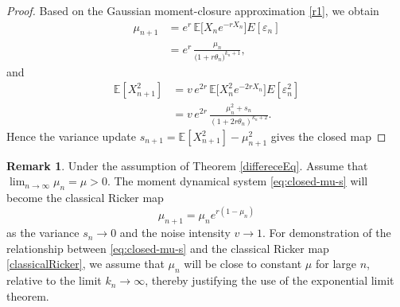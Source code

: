 \documentclass[12pt]{article}
\theoremstyle{definition}
\newtheorem{remark}[theorem]{Remark}
\begin{document}
\begin{proof}
Based on the Gaussian moment-closure approximation \eqref{r1}, we obtain
\begin{align}
\mu_{n+1}
&= e^{r}\,\mathbb{E}\big[X_n e^{-r X_n}\big] E[\varepsilon_n]\\
&= e^{r}\,\frac{\mu_n}{\big(1 + r \theta_n\big)^{k_n+1}},
\label{eq:ricker-mu}
\end{align}
and
\begin{align}
\mathbb{E}[X_{n+1}^2]
&= v\,e^{2r}\,\mathbb{E}\big[X_n^2 e^{-2rX_n}\big] E[\varepsilon_n^2] \\
&= v\,e^{2r}\,\frac{\mu_n^2+s_n}{(1+2r \theta_n)^{k_n+2}}.
\label{eq:ricker-2nd}
\end{align}
Hence the variance update
$
s_{n+1} =\mathbb{E}[X_{n+1}^2] - \mu_{n+1}^2
$
gives the closed map

\end{proof}

\begin{remark}\label{rem:limit} Under the assumption of Theorem \ref{differeceEq}. Assume that $ \lim_{n \to \infty } \mu_n=\mu>0$.  The moment dynamical system \eqref{eq:closed-mu-s} will become the classical Ricker map
 \begin{equation}\label{classicalRicker}
 \mu_{n+1} = \mu_n e^{r(1-\mu_n)}   
 \end{equation}
as the variance $s_n \to 0$ and the noise intensity $v \to 1$. For demonstration of the relationship between \eqref{eq:closed-mu-s} and the classical Ricker map \eqref{classicalRicker}, we assume that $\mu_n$ will be close to constant $\mu$ for large $n$, relative to the limit $k_n \to \infty$, thereby justifying the use of the exponential limit theorem.
\end{remark}
\end{document}
